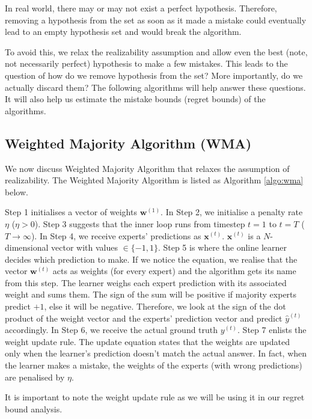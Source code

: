 \documentclass[11pt]{article}
\begin{document}
In real world, there may or may not exist a perfect hypothesis. Therefore, removing a hypothesis from the set as soon as it made a mistake could eventually lead to an empty hypothesis set and would break the algorithm.

To avoid this, we relax the realizability assumption and allow even the best (note, not necessarily perfect) hypothesis to make a few mistakes. This leads to the question of how do we remove hypothesis from the set? More importantly, do we actually discard them? The following algorithms will help answer these questions. It will also help us estimate the mistake bounds (regret bounds) of the algorithms.

\subsection{Weighted Majority Algorithm (WMA)}
\normalfont

We now discuss Weighted Majority Algorithm that relaxes the assumption of realizability.
The Weighted Majority Algorithm \cite{littlestone1989weighted} is listed as Algorithm \ref{algo:wma} below. 

Step 1 initialises a vector of weights $\textbf{w}^{(1)}$. In Step 2, we initialise a penalty rate $\eta$ ($\eta > 0$). Step 3 suggests that the inner loop runs from timestep $t=1$ to $t=T$ ($T \rightarrow \infty$).
In Step 4, we receive experts' predictions as $\textbf{x}^{(t)}$. $\textbf{x}^{(t)}$ is a $N$-dimensional vector with values $\in\{-1, 1\}$. Step 5 is where the online learner decides which prediction to make. If we notice the equation, we realise that the vector $\textbf{w}^{(t)}$ acts as weights (for every expert) and the algorithm gets its name from this step. The learner weighs each expert prediction with its associated weight and sums them. The sign of the sum will be positive if majority experts predict $+1$, else it will be negative. Therefore, we look at the sign of the dot product of the weight vector and the experts' prediction vector and predict $\hat{y}^{(t)}$ accordingly. In Step 6, we receive the actual ground truth ${y}^{(t)}$. Step 7 enlists the weight update rule. The update equation states that the weights are updated only when the learner's prediction doesn't match the actual answer. In fact, when the learner makes a mistake, the weights of the experts (with wrong predictions) are penalised by $ \eta$. 


It is important to note the weight update rule as we will be using it in our regret bound analysis.
\end{document}
